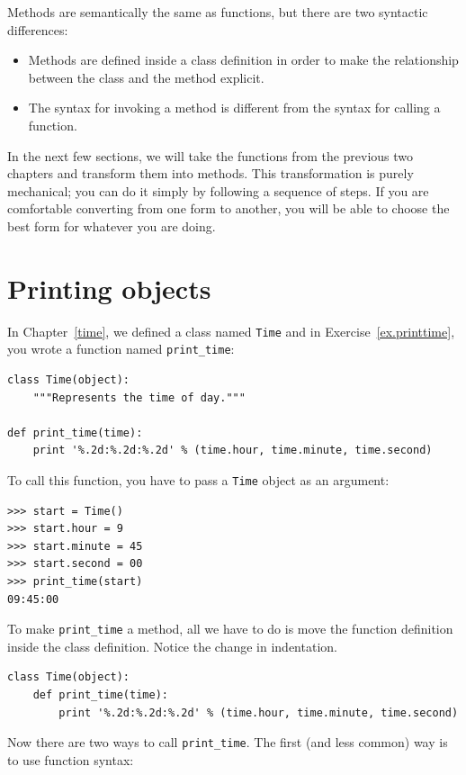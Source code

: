 \documentclass[10pt]{book}
\begin{document}
Methods are semantically the same as functions, but there are
two syntactic differences:

\begin{itemize}

\item Methods are defined inside a class definition in order
to make the relationship between the class and the method explicit.

\item The syntax for invoking a method is different from the
syntax for calling a function.

\end{itemize}

In the next few sections, we will take the functions from the previous
two chapters and transform them into methods.  This transformation is
purely mechanical; you can do it simply by following a sequence of
steps.  If you are comfortable converting from one form to another,
you will be able to choose the best form for whatever you are doing.


\section{Printing objects}

In Chapter~\ref{time}, we defined a class named
{\tt Time} and in Exercise~\ref{ex.printtime}, you 
wrote a function named \verb"print_time":

\begin{verbatim}
class Time(object):
    """Represents the time of day."""

def print_time(time):
    print '%.2d:%.2d:%.2d' % (time.hour, time.minute, time.second)
\end{verbatim}
%
To call this function, you have to pass a {\tt Time} object as an
argument:

\begin{verbatim}
>>> start = Time()
>>> start.hour = 9
>>> start.minute = 45
>>> start.second = 00
>>> print_time(start)
09:45:00
\end{verbatim}
%
To make \verb"print_time" a method, all we have to do is
move the function definition inside the class definition.  Notice
the change in indentation.

\begin{verbatim}
class Time(object):
    def print_time(time):
        print '%.2d:%.2d:%.2d' % (time.hour, time.minute, time.second)
\end{verbatim}
%
Now there are two ways to call \verb"print_time".  The first
(and less common) way is to use function syntax:
\end{document}
